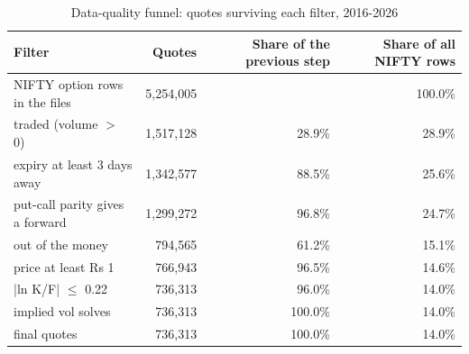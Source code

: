 \begin{table}[ht]
\centering
\small
\caption{Data-quality funnel: quotes surviving each filter, 2016-2026}
\begin{tabular}{lrrr}
\toprule
Filter & Quotes & Share of the previous step & Share of all NIFTY rows \\
\midrule
NIFTY option rows in the files & 5,254,005 &  & 100.0\% \\
traded (volume $>$ 0) & 1,517,128 & 28.9\% & 28.9\% \\
expiry at least 3 days away & 1,342,577 & 88.5\% & 25.6\% \\
put-call parity gives a forward & 1,299,272 & 96.8\% & 24.7\% \\
out of the money & 794,565 & 61.2\% & 15.1\% \\
price at least Rs 1 & 766,943 & 96.5\% & 14.6\% \\
|ln K/F| $\leq$ 0.22 & 736,313 & 96.0\% & 14.0\% \\
implied vol solves & 736,313 & 100.0\% & 14.0\% \\
final quotes & 736,313 & 100.0\% & 14.0\% \\
\bottomrule
\end{tabular}
\par{}
\end{table}
